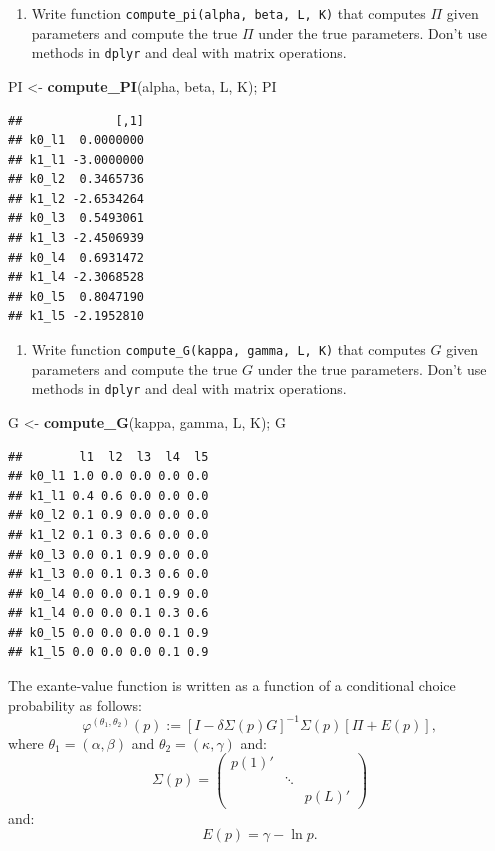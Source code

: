 \documentclass[]{book}
\newenvironment{Shaded}{\begin{snugshade}}{\end{snugshade}}
\newcommand{\KeywordTok}[1]{\textcolor[rgb]{0.13,0.29,0.53}{\textbf{#1}}}
\newcommand{\StringTok}[1]{\textcolor[rgb]{0.31,0.60,0.02}{#1}}
\newcommand{\NormalTok}[1]{#1}
\providecommand{\tightlist}{%
  \setlength{\itemsep}{0pt}\setlength{\parskip}{0pt}}
\begin{document}
\begin{enumerate}
\def\labelenumi{\arabic{enumi}.}
\setcounter{enumi}{1}
\tightlist
\item
  Write function \texttt{compute\_pi(alpha,\ beta,\ L,\ K)} that
  computes \(\Pi\) given parameters and compute the true \(\Pi\) under
  the true parameters. Don't use methods in \texttt{dplyr} and deal with
  matrix operations.
\end{enumerate}

\begin{Shaded}
\begin{Highlighting}[]
\NormalTok{PI <-}\StringTok{ }\KeywordTok{compute_PI}\NormalTok{(alpha, beta, L, K); PI}
\end{Highlighting}
\end{Shaded}

\begin{verbatim}
##             [,1]
## k0_l1  0.0000000
## k1_l1 -3.0000000
## k0_l2  0.3465736
## k1_l2 -2.6534264
## k0_l3  0.5493061
## k1_l3 -2.4506939
## k0_l4  0.6931472
## k1_l4 -2.3068528
## k0_l5  0.8047190
## k1_l5 -2.1952810
\end{verbatim}

\begin{enumerate}
\def\labelenumi{\arabic{enumi}.}
\setcounter{enumi}{2}
\tightlist
\item
  Write function \texttt{compute\_G(kappa,\ gamma,\ L,\ K)} that
  computes \(G\) given parameters and compute the true \(G\) under the
  true parameters. Don't use methods in \texttt{dplyr} and deal with
  matrix operations.
\end{enumerate}

\begin{Shaded}
\begin{Highlighting}[]
\NormalTok{G <-}\StringTok{ }\KeywordTok{compute_G}\NormalTok{(kappa, gamma, L, K); G}
\end{Highlighting}
\end{Shaded}

\begin{verbatim}
##        l1  l2  l3  l4  l5
## k0_l1 1.0 0.0 0.0 0.0 0.0
## k1_l1 0.4 0.6 0.0 0.0 0.0
## k0_l2 0.1 0.9 0.0 0.0 0.0
## k1_l2 0.1 0.3 0.6 0.0 0.0
## k0_l3 0.0 0.1 0.9 0.0 0.0
## k1_l3 0.0 0.1 0.3 0.6 0.0
## k0_l4 0.0 0.0 0.1 0.9 0.0
## k1_l4 0.0 0.0 0.1 0.3 0.6
## k0_l5 0.0 0.0 0.0 0.1 0.9
## k1_l5 0.0 0.0 0.0 0.1 0.9
\end{verbatim}

The exante-value function is written as a function of a conditional
choice probability as follows: \[
\varphi^{(\theta_1, \theta_2)}(p) := [I - \delta \Sigma(p) G]^{-1}\Sigma(p)[\Pi + E(p)],
\] where \(\theta_1 = (\alpha, \beta)\) and
\(\theta_2 = (\kappa, \gamma)\) and: \[
\Sigma(p) =
\begin{pmatrix}
p(1)' & & \\
 & \ddots & \\
 & & p(L)'
\end{pmatrix}
\] and: \[
E(p) = 
\gamma - \ln p.
\]
\end{document}
